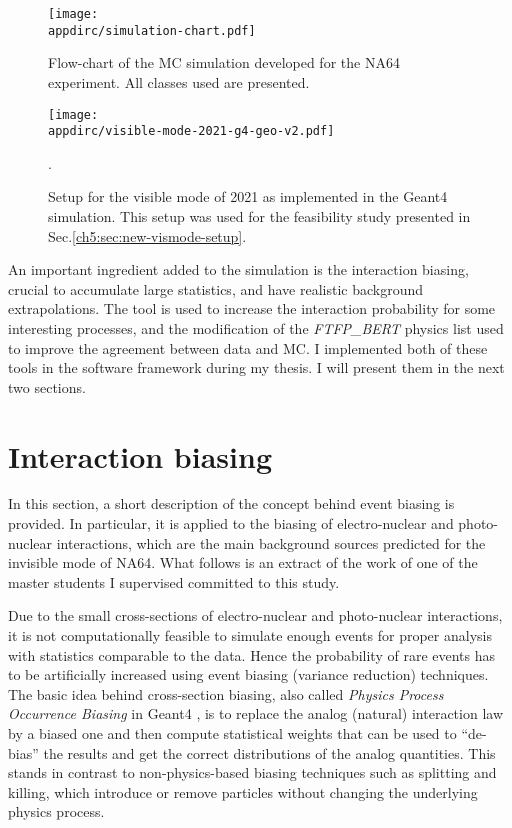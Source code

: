 \begin{figure}[tbh!]
    \centering
    \texttt{[image: \\appdirc/simulation-chart.pdf]}
    \caption{Flow-chart of the MC simulation developed for the NA64 experiment. All classes used are presented.}
    \label{fig:sim-chart}
\end{figure}

\begin{figure}[bth!]
    \centering
    \texttt{[image: \\appdirc/visible-mode-2021-g4-geo-v2.pdf]}
    \caption{Setup for the visible mode of 2021 as implemented in the Geant4 simulation. This setup was used for the feasibility study presented in Sec.\ref{ch5:sec:new-vismode-setup}.}.
    \label{fig:setup-2021-g4}
\end{figure}

An important ingredient added to the simulation is the interaction biasing, crucial to accumulate large statistics, and have realistic background extrapolations. The tool is used to increase the interaction probability for some interesting processes, and the modification of the \textit{FTFP\_BERT} physics list used to improve the agreement between data and MC. I implemented both of these tools in the software framework during my thesis. I will present them in the next two sections.

\FloatBarrier\noindent
\section{Interaction biasing}
\label{appC:sec:interaction-biasing}

In this section, a short description of the concept behind event biasing is provided. In particular, it is applied to the biasing of electro-nuclear and photo-nuclear interactions, which are the main background sources predicted for the invisible mode of NA64. What follows is an extract of the work of one of the master students I supervised committed to this study\cite{pdegen-thesis}.

Due to the small cross-sections of electro-nuclear and photo-nuclear interactions, it is not computationally feasible to simulate enough events for proper analysis with statistics comparable to the data. Hence the probability of rare events has to be artificially increased using event biasing (variance reduction) techniques. The basic idea behind cross-section biasing, also called \textit{Physics Process Occurrence Biasing} in Geant4 \cite{G4bias}, is to replace the analog (natural) interaction law by a biased one and then compute statistical weights that can be used to ``de-bias'' the results and get the correct distributions of the analog quantities. This stands in contrast to non-physics-based biasing techniques such as splitting and killing, which introduce or remove particles without changing the underlying physics process.

